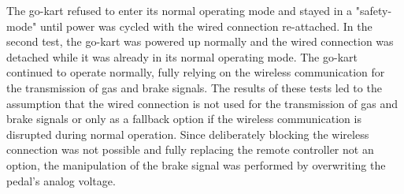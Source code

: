 The go-kart refused to enter its normal operating mode and stayed in a "safety-mode" until power was cycled with the wired connection re-attached.
In the second test, the go-kart was powered up normally and the wired connection was detached while it was already in its normal operating mode.
The go-kart continued to operate normally, fully relying on the wireless communication for the transmission of gas and brake signals.
The results of these tests led to the assumption that the wired connection is not used for the transmission of gas and brake signals or only as a fallback option if the wireless communication is disrupted during normal operation.
Since deliberately blocking the wireless connection was not possible and fully replacing the remote controller not an option, the manipulation of the brake signal was performed by overwriting the pedal's analog voltage.

